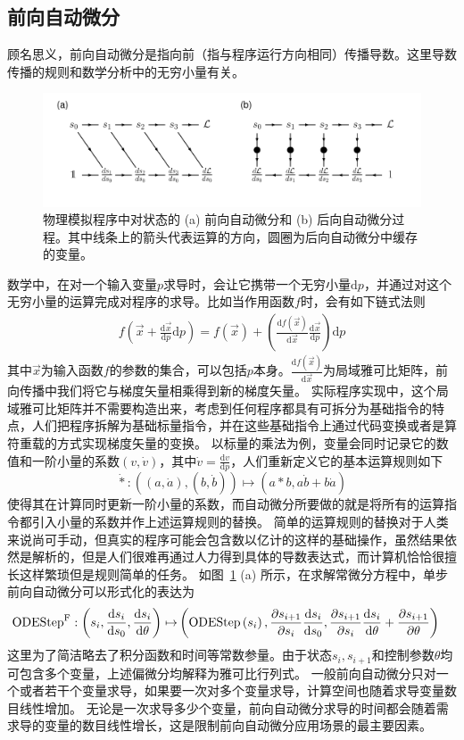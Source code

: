 \documentclass[A4,twoside,UTF8]{ctexart}
\def\D{\mathrm{d}}
\begin{document}
\subsection{前向自动微分}
    顾名思义，前向自动微分是指向前（指与程序运行方向相同）传播导数。这里导数传播的规则和数学分析中的无穷小量有关。
    \begin{figure}[t]
        \centering
        \includegraphics[width=0.9\columnwidth,trim={0 0cm 0 0},clip]{fig3.pdf}
        \caption{物理模拟程序中对状态的 (a) 前向自动微分和 (b) 后向自动微分过程。其中线条上的箭头代表运算的方向，圆圈为后向自动微分中缓存的变量。}\label{fig:autodifftypes}
\end{figure}
数学中，在对一个输入变量$p$求导时，会让它携带一个无穷小量$\D p$，并通过对这个无穷小量的运算完成对程序的求导。比如当作用函数$f$时，会有如下链式法则
\begin{align}
    f(\vec x+ \frac{\D \vec x}{\D p} \D p) = f(\vec x) + \left(\frac{\D f(\vec x)}{\D \vec x}\frac{\D \vec x}{\D p}\right) \D p
\end{align}
其中$\vec x$为输入函数$f$的参数的集合，可以包括$p$本身。$\frac{\D f(\vec x)}{\D \vec x}$为局域雅可比矩阵，前向传播中我们将它与梯度矢量相乘得到新的梯度矢量。
实际程序实现中，这个局域雅可比矩阵并不需要构造出来，考虑到任何程序都具有可拆分为基础指令的特点，人们把程序拆解为基础标量指令，并在这些基础指令上通过代码变换或者是算符重载的方式实现梯度矢量的变换。
以标量的乘法为例，变量会同时记录它的数值和一阶小量的系数$(v, \dot v)$，其中$\dot v = \frac{\D v}{\D p}$，人们重新定义它的基本运算规则如下
$$\dot{*}: ((a, \dot a), (b, \dot b)) \mapsto (a * b, a \dot b + b \dot a)$$
使得其在计算同时更新一阶小量的系数，而自动微分所要做的就是将所有的运算指令都引入小量的系数并作上述运算规则的替换。
简单的运算规则的替换对于人类来说尚可手动，但真实的程序可能会包含数以亿计的这样的基础操作，虽然结果依然是解析的，但是人们很难再通过人力得到具体的导数表达式，而计算机恰恰很擅长这样繁琐但是规则简单的任务。
如图~\ref{fig:autodifftypes} (a) 所示，在求解常微分方程中，单步前向自动微分可以形式化的表达为
\begin{align*}
    {\rm ODEStep}^{\rm F} : \left(s_{i}, \frac{\D s_{i}}{\D s_0}, \frac{\D s_{i}}{\D \theta}\right)
        \mapsto &\left({\rm ODEStep}\left(s_{i}\right), \frac{\partial s_{i+1}}{\partial s_i} \frac{\D s_{i}}{\D s_0},
        \frac{\partial s_{i+1}}{\partial s_i} \frac{\D s_{i}}{\D \theta} + \frac{\partial s_{i+1}}{\partial \theta}\right)
\end{align*}
这里为了简洁略去了积分函数和时间等常数参量。由于状态$s_i, s_{i+1}$和控制参数$\theta$均可包含多个变量，上述偏微分均解释为雅可比行列式。
一般前向自动微分只对一个或者若干个变量求导，如果要一次对多个变量求导，计算空间也随着求导变量数目线性增加。
无论是一次求导多少个变量，前向自动微分求导的时间都会随着需求导的变量的数目线性增长，这是限制前向自动微分应用场景的最主要因素。
\end{document}
